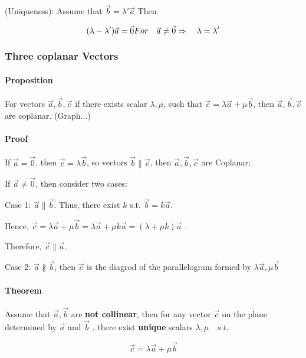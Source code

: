 \documentclass[UTF8]{ctexart}
\begin{document}
(Uniqueness): Assume that $\vec b = \lambda ' \vec a $ Then 
    
$$
     	(\lambda -\lambda ' )\vec a  = \vec 0 \\
  	     For \quad \vec a \neq \vec 0 \\
      	 \Rightarrow  \quad \lambda = \lambda '
$$

\subsubsection{Three coplanar Vectors}

\paragraph{Proposition}
For vectors $\vec a, \vec b ,\vec c $ if there exists scalar $\lambda , \mu $, such that $\vec c = \lambda \vec a +\mu \vec b $, then $\vec a, \vec b, \vec c$ are coplanar. (Graph...)
 
\paragraph{Proof}

If $\vec a  = \vec 0$, then $\vec c = \lambda \vec  b$, so vectors $\vec  b \parallel \vec  c$, then $\vec  a, \vec  b, \vec  c $ are Coplanar;

If $\vec  a \neq \vec  0 $, then consider two cases:

Case 1: $\vec  a \parallel \vec  b$. Thus, there exist $k$ s.t. $\vec  b = k \vec  a $. 

Hence, $\vec  c = \lambda \vec  a + \mu \vec  b = \lambda \vec  a +\mu k \vec  a  = (\lambda + \mu k ) \vec  a $ .

Therefore, $\vec c \parallel \vec  a$. 

Case 2: $\vec  a \not \parallel \vec  b$, then $\vec  c$ is the diagrod of the parallelogram formed by $\lambda \vec  a, \mu \vec  b$

\paragraph{Theorem}

Assume that $\vec a, \vec b $ are \textbf{not collinear}, then for any vector $\vec c $  on the plane determined by $\vec a$ and $\vec b $ , there exist \textbf{unique} scalars $\lambda , \mu \quad s.t. \quad $


  $$
  \vec c = \lambda \vec a + \mu \vec b
  $$
  
\end{document}
